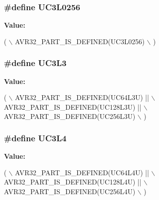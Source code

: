 \hypertarget{group__uc3__part__macros__group_gaa8ab88d4e48e7936416c4475b42e5b49}{
\subsubsection[{U\-C3\-L0256}]{\setlength{\rightskip}{0pt plus 5cm}\#define U\-C3\-L0256}}\label{group__uc3__part__macros__group_gaa8ab88d4e48e7936416c4475b42e5b49}
{\bfseries Value\-:}
\begin{DoxyCode}
( \(\backslash\)
                AVR32\_PART\_IS\_DEFINED(UC3L0256) \(\backslash\)
                )
\end{DoxyCode}
\hypertarget{group__uc3__part__macros__group_gade3b8d2d26305ef47bb7b52212807e1d}{
\subsubsection[{U\-C3\-L3}]{\setlength{\rightskip}{0pt plus 5cm}\#define U\-C3\-L3}}\label{group__uc3__part__macros__group_gade3b8d2d26305ef47bb7b52212807e1d}
{\bfseries Value\-:}
\begin{DoxyCode}
(       \(\backslash\)
                AVR32\_PART\_IS\_DEFINED(UC64L3U)  || \(\backslash\)
                AVR32\_PART\_IS\_DEFINED(UC128L3U) || \(\backslash\)
                AVR32\_PART\_IS\_DEFINED(UC256L3U) \(\backslash\)
                )
\end{DoxyCode}
\hypertarget{group__uc3__part__macros__group_gae119ee2bcbfe63aa6cb0bc92245943f6}{
\subsubsection[{U\-C3\-L4}]{\setlength{\rightskip}{0pt plus 5cm}\#define U\-C3\-L4}}\label{group__uc3__part__macros__group_gae119ee2bcbfe63aa6cb0bc92245943f6}
{\bfseries Value\-:}
\begin{DoxyCode}
(       \(\backslash\)
                AVR32\_PART\_IS\_DEFINED(UC64L4U)  || \(\backslash\)
                AVR32\_PART\_IS\_DEFINED(UC128L4U) || \(\backslash\)
                AVR32\_PART\_IS\_DEFINED(UC256L4U) \(\backslash\)
                )
\end{DoxyCode}

